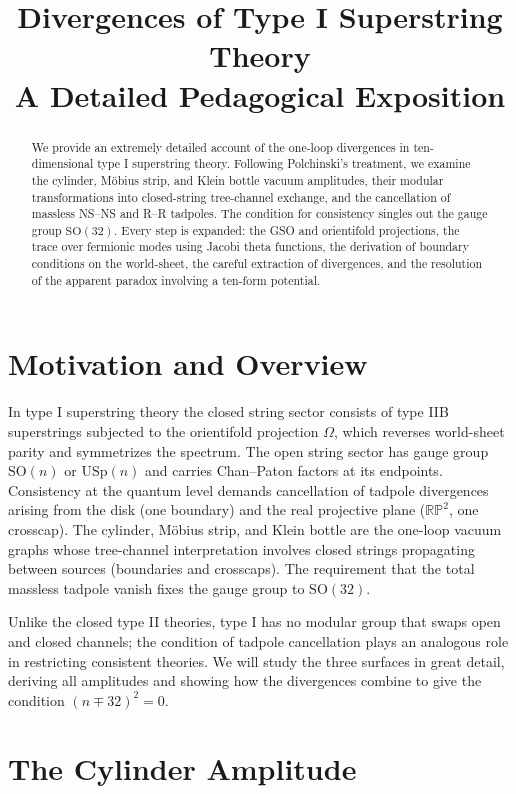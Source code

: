 \documentclass[11pt,a4paper]{article}
\title{\textbf{Divergences of Type I Superstring Theory}\\[3pt]
\large A Detailed Pedagogical Exposition}
\author{}
\date{}
\begin{document}
\maketitle

\begin{abstract}
We provide an extremely detailed account of the one-loop divergences in ten-dimensional type I superstring theory. Following Polchinski's treatment, we examine the cylinder, M\"obius strip, and Klein bottle vacuum amplitudes, their modular transformations into closed-string tree-channel exchange, and the cancellation of massless NS–NS and R–R tadpoles. The condition for consistency singles out the gauge group $\mathrm{SO}(32)$. Every step is expanded: the GSO and orientifold projections, the trace over fermionic modes using Jacobi theta functions, the derivation of boundary conditions on the world-sheet, the careful extraction of divergences, and the resolution of the apparent paradox involving a ten-form potential.
\end{abstract}

\tableofcontents

\section{Motivation and Overview}
In type I superstring theory the closed string sector consists of type IIB superstrings subjected to the orientifold projection $\Omega$, which reverses world-sheet parity and symmetrizes the spectrum. The open string sector has gauge group $\mathrm{SO}(n)$ or $\mathrm{USp}(n)$ and carries Chan–Paton factors at its endpoints. Consistency at the quantum level demands cancellation of tadpole divergences arising from the disk (one boundary) and the real projective plane ($\mathbb{RP}^2$, one crosscap). The cylinder, M\"obius strip, and Klein bottle are the one-loop vacuum graphs whose tree-channel interpretation involves closed strings propagating between sources (boundaries and crosscaps). The requirement that the total massless tadpole vanish fixes the gauge group to $\mathrm{SO}(32)$.

Unlike the closed type II theories, type I has no modular group that swaps open and closed channels; the condition of tadpole cancellation plays an analogous role in restricting consistent theories. We will study the three surfaces in great detail, deriving all amplitudes and showing how the divergences combine to give the condition $(n \mp 32)^2 = 0$.

\section{The Cylinder Amplitude}
\end{document}
